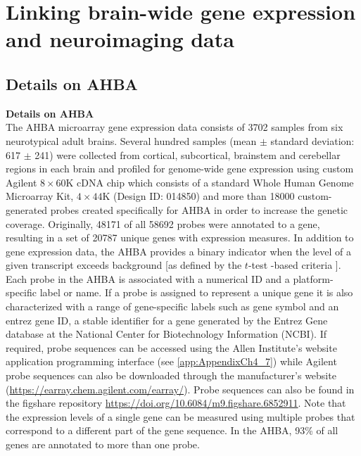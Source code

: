 \chapter{Linking brain-wide gene expression and neuroimaging data}
\label{appendixB}

\section{Details on AHBA}
\label{app:AppendixCh4_1}

\textbf{Details on AHBA}\\
The AHBA microarray gene expression data consists of \num{3702} samples from six  neurotypical adult brains. Several hundred samples (mean $\pm$ standard deviation: 617 $\pm$ 241) were collected from cortical, subcortical, brainstem and cerebellar regions in each brain and profiled for genome-wide gene expression using custom Agilent $8\times60$K cDNA chip which consists of a standard Whole Human Genome Microarray Kit, $4\times44$K (Design ID: 014850) and more than \num{18000} custom-generated probes created specifically for AHBA in order to increase the genetic coverage. Originally, \num{48171} of all \num{58692} probes were annotated to a gene, resulting in a set of \num{20787} unique genes with expression measures. In addition to gene expression data, the AHBA provides a binary indicator when the level of a given transcript exceeds background [as defined by the $t$-test -based criteria \citep{AHBAdoc}].
Each probe in the AHBA is associated with a numerical ID and a platform-specific label or name. If a probe is assigned to represent a unique gene it is also characterized with a range of gene-specific labels such as gene symbol and an entrez gene ID, a stable identifier for a gene generated by the Entrez Gene database at the National Center for Biotechnology Information (NCBI). If required, probe sequences can be accessed using the Allen Institute’s website application programming interface (see \ref{app:AppendixCh4_7}) while Agilent probe sequences can also be downloaded through the manufacturer's website (\url{https://earray.chem.agilent.com/earray/}). Probe sequences can also be found in the figshare repository \url{https://doi.org/10.6084/m9.figshare.6852911}. Note that the expression levels of a single gene can be measured using multiple probes that correspond to a different part of the gene sequence. In the AHBA, 93\% of all genes are annotated to more than one probe.


